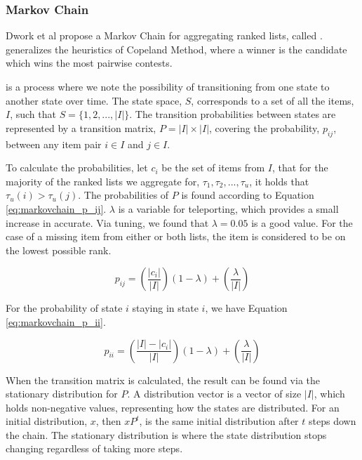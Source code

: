 \subsubsection{Markov Chain}\label{sec:markovchain}

Dwork et al propose a Markov Chain for aggregating ranked lists, called \MC\cite{rank:aggregation}. \MC generalizes the heuristics of Copeland Method, where a winner is the candidate which wins the most pairwise contests\cite{saari1996}.

\MC is a process where we note the possibility of transitioning from one state to another state over time. The \MC state space, $S$, corresponds to a set of all the items, $I$, such that $S = \{1, 2,..., |I|\}$. The transition probabilities between states are represented by a transition matrix, $P = |I| \times |I|$, covering the probability, $p_{ij}$, between any item pair $i \in I$ and $j \in I$.

To calculate the probabilities, let $c_i$ be the set of items from $I$, that for the majority of the ranked lists we aggregate for, $\tau_1, \tau_2, ...,\tau_u$, it holds that $\tau_u(i) > \tau_u(j)$. The probabilities of $P$ is found according to Equation \ref{eq:markovchain_p_ij}. $\lambda$ is a variable for teleporting, which provides a small increase in accurate. Via tuning, we found that $\lambda = 0.05$ is a good value. For the case of a missing item from either or both lists, the item is considered to be on the lowest possible rank.

\begin{equation}\label{eq:markovchain_p_ij}
p_{ij} = (\frac{|c_i|}{|I|})(1-\lambda)+(\frac{\lambda}{|I|})
\end{equation}

For the probability of state $i$ staying in state $i$, we have Equation \ref{eq:markovchain_p_ii}.

\begin{equation}\label{eq:markovchain_p_ii}
p_{ii} = (\frac{|I|-|c_i|}{|I|})(1-\lambda)+(\frac{\lambda}{|I|})
\end{equation}

When the transition matrix is calculated, the result can be found via the stationary distribution for $P$. A distribution vector is a vector of size $|I|$, which holds non-negative values, representing how the states are distributed. For an initial distribution, $x$, then $xP^t$, is the same initial distribution after $t$ steps down the chain. The stationary distribution is where the state distribution stops changing regardless of taking more steps.

